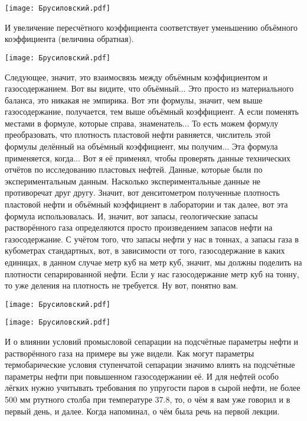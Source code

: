 \documentclass[main.tex]{subfiles}
\begin{document}
\begin{center}
\texttt{[image: Брусиловский.pdf]}
\end{center}

И увеличение пересчётного коэффициента соответствует уменьшению объёмного коэффициента (величина обратная).

\begin{center}
\texttt{[image: Брусиловский.pdf]}
\end{center}

Следующее, значит, это взаимосвязь между объёмным коэффициентом и газосодержанием.
Вот вы видите, что объёмный... Это просто из материального баланса, это никакая не эмпирика.
Вот эти формулы, значит, чем выше газосодержание, получается, тем выше объёмный коэффициент.
А если поменять местами в формуле, которые справа, знаменатель...
То есть можем формулу преобразовать, что плотность пластовой нефти равняется, числитель этой формулы делённый на объёмный коэффициент, мы получим...
Эта формула применяется, когда... Вот я её применял, чтобы проверять данные технических отчётов по исследованию пластовых нефтей.
Данные, которые были по экспериментальным данным.
Насколько экспериментальные данные не противоречат друг другу.
Значит, вот денситометром полученные плотность пластовой нефти и объёмный коэффициент в лаборатории и так далее, вот эта формула использовалась.
И, значит, вот запасы, геологические запасы растворённого газа определяются просто произведением запасов нефти на газосодержание.
С учётом того, что запасы нефти у нас в тоннах, а запасы газа в кубометрах стандартных, вот, в зависимости от того, газосодержание в каких единицах, в данном случае метр куб на метр куб, значит, мы должны поделить на плотности сепарированной нефти.
Если у нас газосодержание метр куб на тонну, то уже деления на плотность не требуется.
Ну вот, понятно вам.

\begin{center}
\texttt{[image: Брусиловский.pdf]}
\end{center}



\begin{center}
\texttt{[image: Брусиловский.pdf]}
\end{center}

И о влиянии условий промысловой сепарации на подсчётные параметры нефти и растворённого газа на примере вы уже видели.
Как могут параметры термобарические условия ступенчатой сепарации значимо влиять на подсчётные параметры нефти при повышенном газосодержании её.
И для нефтей особо лёгких нужно учитывать требования по упругости паров в сырой нефти, не более 500 мм ртутного столба при температуре 37.8, то, о чём я вам уже говорил и в первый день, и далее.
Когда напоминал, о чём была речь на первой лекции.
\end{document}
